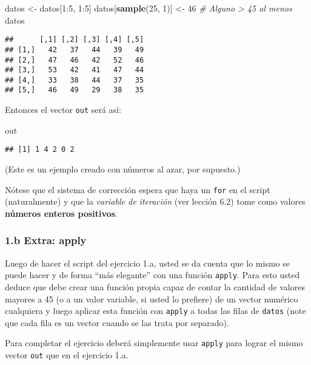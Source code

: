 \documentclass[]{article}
\newenvironment{Shaded}{}{}
\newcommand{\KeywordTok}[1]{\textcolor[rgb]{0.00,0.44,0.13}{\textbf{{#1}}}}
\newcommand{\DecValTok}[1]{\textcolor[rgb]{0.25,0.63,0.44}{{#1}}}
\newcommand{\CommentTok}[1]{\textcolor[rgb]{0.38,0.63,0.69}{\textit{{#1}}}}
\newcommand{\NormalTok}[1]{{#1}}
\begin{document}
\begin{Shaded}
\begin{Highlighting}[]
\NormalTok{datos <- datos[}\DecValTok{1}\NormalTok{:}\DecValTok{5}\NormalTok{, }\DecValTok{1}\NormalTok{:}\DecValTok{5}\NormalTok{]}
\NormalTok{datos[}\KeywordTok{sample}\NormalTok{(}\DecValTok{25}\NormalTok{, }\DecValTok{1}\NormalTok{)] <- }\DecValTok{46}  \CommentTok{# Alguno > 45 al menos}
\NormalTok{datos}
\end{Highlighting}
\end{Shaded}
\begin{verbatim}
##      [,1] [,2] [,3] [,4] [,5]
## [1,]   42   37   44   39   49
## [2,]   47   46   42   52   46
## [3,]   53   42   41   47   44
## [4,]   33   38   44   37   35
## [5,]   46   49   29   38   35
\end{verbatim}
Entonces el vector \texttt{out} será así:

\begin{Shaded}
\begin{Highlighting}[]
\NormalTok{out}
\end{Highlighting}
\end{Shaded}
\begin{verbatim}
## [1] 1 4 2 0 2
\end{verbatim}
(Este es un ejemplo creado con números al azar, por supuesto.)

Nótese que el sistema de corrección espera que haya un \texttt{for} en
el script (naturalmente) y que la \emph{variable de iteración} (ver
lección 6.2) tome como valores \textbf{números enteros positivos}.

\subsubsection{1.b Extra: apply}

Luego de hacer el script del ejercicio 1.a, usted se da cuenta que lo
mismo se puede hacer y de forma ``más elegante'' con una función
\texttt{apply}. Para esto usted deduce que debe crear una función propia
capaz de contar la cantidad de valores mayores a 45 (o a un valor
variable, si usted lo prefiere) de un vector numérico cualquiera y luego
aplicar esta función con \texttt{apply} a todas las filas de
\texttt{datos} (note que cada fila es un vector cuando se las trata por
separado).

Para completar el ejercicio deberá simplemente usar \texttt{apply} para
lograr el mismo vector \texttt{out} que en el ejercicio 1.a.
\end{document}
